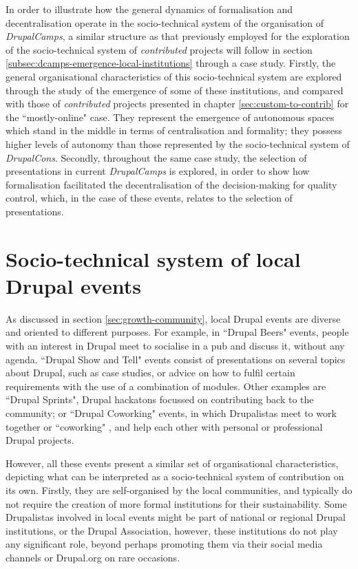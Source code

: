 In order to illustrate how the general dynamics of formalisation and decentralisation operate in the socio-technical system of the organisation of \textit{DrupalCamps}, a similar structure as that previously employed for the exploration of the socio-technical system of \textit{contributed} projects will follow in section \ref{subsec:dcamps-emergence-local-institutions} through a case study. Firstly, the general organisational characteristics of this socio-technical system are explored through the study of the emergence of some of these institutions, and compared with those of \textit{contributed} projects presented in chapter \ref{sec:custom-to-contrib} for the ``mostly-online" case. They represent the emergence of autonomous spaces which stand in the middle in terms of centralisation and formality; they possess higher levels of autonomy than those represented by the socio-technical system of \textit{DrupalCons}. Secondly, throughout the same case study, the selection of presentations in current \textit{DrupalCamps} is explored, in order to show how formalisation facilitated the decentralisation of the decision-making for quality control, which, in the case of these events, relates to the selection of presentations.

\section{Socio-technical system of local Drupal events}
\label{subsec:local-events}

As discussed in section \ref{sec:growth-community}, local Drupal events are diverse and oriented to different purposes. For example,  in ``Drupal Beers" events, people with an interest in Drupal meet to socialise in a pub and discuss it, without any agenda. ``Drupal Show and Tell" events consist of presentations on several topics about Drupal, such as case studies, or advice on how to fulfil certain requirements with the use of a combination of modules. Other examples are ``Drupal Sprints",  Drupal hackatons \parencite{lapp20072006} focussed on contributing back to the community; or ``Drupal Coworking" events, in which Drupalistas meet to work together or ``coworking" \parencite{spinuzzi2012working}, and help each other with personal or professional Drupal projects.

However, all these events present a similar set of organisational characteristics, depicting what can be interpreted as a socio-technical system of contribution on its own. Firstly, they are self-organised by the local communities, and typically do not require the creation of more formal institutions for their sustainability. Some Drupalistas involved in local events might be part of national or regional Drupal institutions, or the Drupal Association, however, these institutions do not play any significant role, beyond perhaps promoting them via their social media channels or Drupal.org on rare occasions.

